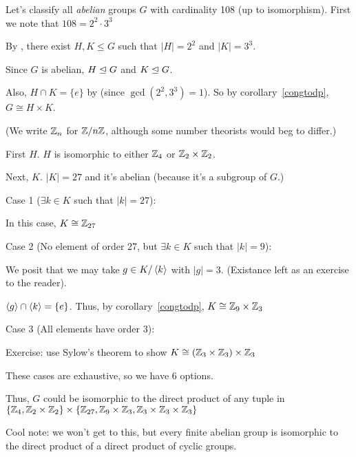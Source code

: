 \documentclass[notes.tex]{subfiles}
\begin{document}
\begin{eg}
	Let's classify all \emph{abelian} groups $G$ with cardinality 108 (up to isomorphism). First we note that $108 =2^2\cdot 3^3$

	By , there exist $H, K\le G$ such that $|H| = 2^2$ and $|K| = 3^3$.

	Since $G$ is abelian, $H\trianglelefteq G$ and $K\trianglelefteq G$.

	Also, $H\cap K = \{e\}$ by  (since $\gcd(2^2, 3^3)=1$). So by corollary~\ref{congtodp}, $G\cong H\times K$.

	(We write $\mathbb{Z}_n$ for $\mathbb{Z}/n\mathbb{Z}$, although some number theorists would beg to differ.)

	First $H$. $H$ is isomorphic to either $\mathbb{Z}_4$ or $\mathbb{Z}_2\times\mathbb{Z}_2$.

	Next, $K$. $|K| = 27$ and it's abelian (because it's a subgroup of $G$.)

	Case 1 ($\exists k\in K$ such that $|k| = 27$):
	\begin{tabin}
		In this case, $K\cong\mathbb{Z}_{27}$
	\end{tabin}
	Case 2 (No element of order 27, but $\exists k\in K$ such that $|k| = 9$):
	\begin{tabin}
		We posit that we may take $g\in K/\left\langle{k}\right\rangle$ with $|g| = 3$. (Existance left as an exercise to the reader).

		$\left\langle{g}\right\rangle\cap \left\langle{k}\right\rangle = \{e\}$.
		Thus, by corollary~\ref{congtodp}, $K\cong \mathbb{Z}_9\times \mathbb{Z}_3$
	\end{tabin}
	Case 3 (All elements have order 3):
	\begin{tabin}
		Exercise: use Sylow's theorem to show $K\cong (\mathbb{Z}_3\times\mathbb{Z}_3)\times\mathbb{Z}_3$
	\end{tabin}

	These cases are exhaustive, so we have 6 options.

	Thus, $G$ could be isomorphic to the direct product of any tuple in
	$\{\mathbb{Z}_4, \mathbb{Z}_2\times\mathbb{Z}_2\} \times \{\mathbb{Z}_{27}, \mathbb{Z}_9\times \mathbb{Z}_3, \mathbb{Z}_3\times\mathbb{Z}_3\times\mathbb{Z}_3\}$
\end{eg}

Cool note: we won't get to this, but every finite abelian group is isomorphic to the direct product of a direct product of cyclic groups.
\end{document}
